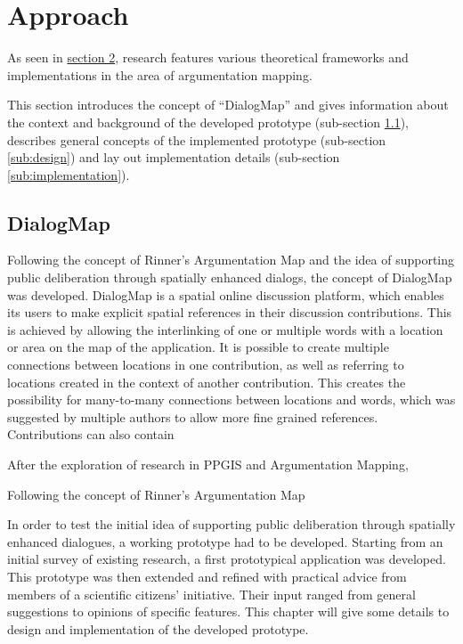 \section{Approach}
\label{chap:approach}

As seen in \hyperref[chap:related_work]{section 2}, research features various theoretical frameworks and implementations in the area of argumentation mapping. 

This section introduces the concept of ``DialogMap'' and gives information about the context and background of the developed prototype (sub-section \ref{sub:dialogmap}), describes general concepts of the implemented prototype (sub-section \ref{sub:design}) and lay out implementation details (sub-section \ref{sub:implementation}).

\subsection{DialogMap}
\label{sub:dialogmap}

Following the concept of Rinner's Argumentation Map \cite{Rinner_ArgumentationMaps} and the idea of supporting public deliberation through spatially enhanced dialogs, the concept of DialogMap was developed. DialogMap is a spatial online discussion platform, which enables its users to make explicit spatial references in their discussion contributions. This is achieved by allowing the interlinking of one or multiple words with a location or area on the map of the application. It is possible to create multiple connections between locations in one contribution, as well as referring to locations created in the context of another contribution. This creates the possibility for many-to-many connections between locations and words, which was suggested by multiple authors \cite{Kessler2005_ArgumentationMapPrototype,Voss2004_Evolution_PGIS,you2009_participatory_map_based,Cai2009_spatial_annotation_deliberation} to allow more fine grained references. Contributions can also contain 

After the exploration of research in PPGIS and Argumentation Mapping, 

Following the concept of Rinner's Argumentation Map \cite{Rinner_ArgumentationMaps}

In order to test the initial idea of supporting public deliberation through spatially enhanced dialogues, a working prototype had to be developed. Starting from an initial survey of existing research, a first prototypical application was developed. This prototype was then extended and refined with practical advice from members of a scientific citizens' initiative. Their input ranged from general suggestions to opinions of specific features. This chapter will give some details to design and implementation of the developed prototype.

